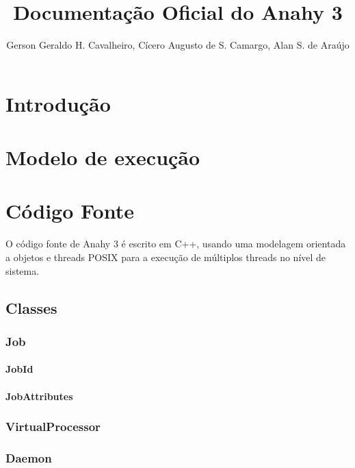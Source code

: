 \documentclass[12pt]{article}
\title{Documentação Oficial do Anahy 3}
\author{Gerson Geraldo H. Cavalheiro, Cícero Augusto de S. Camargo, Alan S. de Araújo}
\begin{document}
\maketitle

\section{Introdução} %
\label{sec:introducao}


\section{Modelo de execução} %
\label{sec:modelo_de_execucao}


\section{Código Fonte} %
\label{sec:codigo}

O código fonte de Anahy 3 é escrito em C++, usando uma modelagem orientada a objetos e threads POSIX para a execução de múltiplos threads no nível de sistema.

\subsection{Classes} %
\label{sub:classes}


\subsubsection{Job}

\paragraph{JobId}


\paragraph{JobAttributes}


\subsubsection{VirtualProcessor}


\subsubsection{Daemon}
\end{document}
